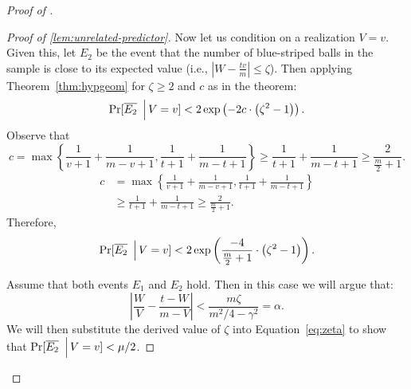 \begin{proof}[Proof of ]
\begin{proof}[Proof of \cref{lem:unrelated-predictor}]
Now let us condition on a realization $V = v$. Given this, let $E_2$ be the event that the number of blue-striped balls in the sample is close to its expected value (i.e., $\left|W -\frac{tv}{m} \right| \leq \zeta$). Then applying Theorem~\ref{thm:hypgeom} for $\zeta \geq 2$ and $c$ as in the theorem:
    \[\Pr[ \overline{E_2} \,\,\,\Big\vert\, V = v] < 2\exp\left(-2c\cdot \left( \zeta^2 - 1\right)\right).\]
Observe that 
\ifnum{}
    $$c = \max\left\{\frac{1}{v+1} + \frac{1}{m-v+1}, \frac{1}{t+1} + \frac{1}{m-t+1}\right\} \geq \frac{1}{t+1} + \frac{1}{m-t+1} \geq \frac{2}{\frac{m}{2}+1}.$$
\else
  \begin{align*}
  c & = \max\left\{\frac{1}{v+1} + \frac{1}{m-v+1}, \frac{1}{t+1} + \frac{1}{m-t+1}\right\} \\
  & \geq \frac{1}{t+1} + \frac{1}{m-t+1} \geq \frac{2}{\frac{m}{2}+1}.
  \end{align*}
\fi
Therefore,
\begin{equation}\label{eq:zeta}
    \Pr[\overline{E_2} \,\,\,\Big\vert\, V = v] < 2\exp\left(\frac{-4}{\frac{m}{2}+1}\cdot \left( \zeta^2 - 1\right)\right).
\end{equation}

Assume that both events $E_1$ and $E_2$ hold. Then in this case we will argue that:
\begin{equation}\label{eq:alpha}
    \left|\frac{W}{V} - \frac{t - W}{m - V}\right| < \frac{m\zeta}{m^2/4 - \gamma^2} = \alpha.
\end{equation}
We will then substitute the derived value of $\zeta$ into Equation~\ref{eq:zeta} to show that $\Pr[ \overline{E_2} \,\,\,\Big\vert\, V = v] < \mu/2$.


\end{proof}
\end{proof}

